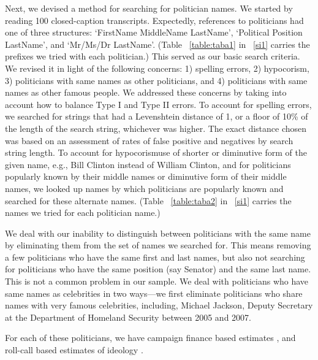 \documentclass[12pt, letterpaper]{article}
\begin{document}
Next, we devised a method for searching for politician names. We started by reading 100 closed-caption transcripts. Expectedly, references to politicians had one of three structures: `FirstName MiddleName LastName', `Political Position LastName', and `Mr/Ms/Dr LastName'. (Table ~\ref{table:taba1} in ~\ref{si1} carries the prefixes we tried with each politician.) This served as our basic search criteria. We revised it in light of the following concerns: 1) spelling errors,  2) hypocorism, 3) politicians with same names as other politicians, and 4) politicians with same names as other famous people. We addressed these concerns by taking into account how to balance Type I and Type II errors. To account for spelling errors, we searched for strings that had a Levenshtein distance of 1, or a floor of 10\% of the length of the search string, whichever was higher. The exact distance chosen was based on an assessment of rates of false positive and negatives by search string length. To account for hypocorism\textemdash use of shorter or diminutive form of the given name, e.g., Bill Clinton instead of William Clinton, and for politicians popularly known by their middle names or diminutive form of their middle names, we looked up names by which politicians are popularly known and searched for these alternate names. (Table ~\ref{table:taba2} in ~\ref{si1} carries the names we tried for each politician name.)

We deal with our inability to distinguish between politicians with the same name by eliminating them from the set of names we searched for. This means removing a few politicians who have the same first and last names, but also not searching for politicians who have the same position (say Senator) and the same last name. This is not a common problem in our sample. We deal with politicians who have same names as celebrities in two ways---we first eliminate politicians who share names with very famous celebrities, including, Michael Jackson, Deputy Secretary at the Department of Homeland Security between 2005 and 2007.

For each of these politicians, we have campaign finance based estimates \citep{bonica2013}, and roll-call based estimates of ideology \citep{mccarty2006}. %
\end{document}
